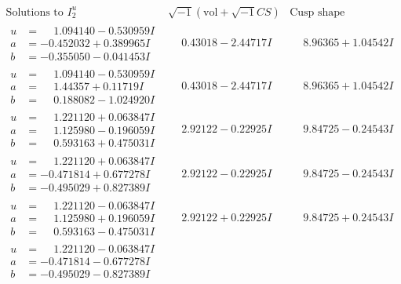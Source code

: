 \documentclass[1p]{elsarticle_modified}
\theoremstyle{definition}
\newcommand{\I}{\sqrt{-1}}
\begin{document}
$$\begin{array}{c|c|c}
 \end{array}$$\newpage$$\begin{array}{c|c|c}  
\text{Solutions to }I^u_{2}& \I (\text{vol} + \sqrt{-1}CS) & \text{Cusp shape}\\
 \hline 
\begin{aligned}
u &= \phantom{-}1.094140 - 0.530959 I \\
a &= -0.452032 + 0.389965 I \\
b &= -0.355050 - 0.041453 I\end{aligned}
 & \phantom{-}0.43018 - 2.44717 I & \phantom{-}8.96365 + 1.04542 I \\ \hline\begin{aligned}
u &= \phantom{-}1.094140 - 0.530959 I \\
a &= \phantom{-}1.44357 + 0.11719 I \\
b &= \phantom{-}0.188082 - 1.024920 I\end{aligned}
 & \phantom{-}0.43018 - 2.44717 I & \phantom{-}8.96365 + 1.04542 I \\ \hline\begin{aligned}
u &= \phantom{-}1.221120 + 0.063847 I \\
a &= \phantom{-}1.125980 - 0.196059 I \\
b &= \phantom{-}0.593163 + 0.475031 I\end{aligned}
 & \phantom{-}2.92122 - 0.22925 I & \phantom{-}9.84725 - 0.24543 I \\ \hline\begin{aligned}
u &= \phantom{-}1.221120 + 0.063847 I \\
a &= -0.471814 + 0.677278 I \\
b &= -0.495029 + 0.827389 I\end{aligned}
 & \phantom{-}2.92122 - 0.22925 I & \phantom{-}9.84725 - 0.24543 I \\ \hline\begin{aligned}
u &= \phantom{-}1.221120 - 0.063847 I \\
a &= \phantom{-}1.125980 + 0.196059 I \\
b &= \phantom{-}0.593163 - 0.475031 I\end{aligned}
 & \phantom{-}2.92122 + 0.22925 I & \phantom{-}9.84725 + 0.24543 I \\ \hline\begin{aligned}
u &= \phantom{-}1.221120 - 0.063847 I \\
a &= -0.471814 - 0.677278 I \\
b &= -0.495029 - 0.827389 I\end{aligned}

\end{array}$$
\end{document}
